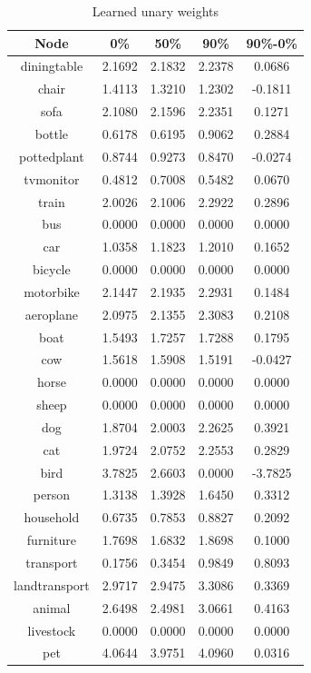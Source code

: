 \documentclass[11pt,a4paper]{article}
\begin{document}
\begin{table}[htbp]
\centering
\begin{tabular}{c|c|c|c|c}
Node & 0\% & 50\% & 90\% & 90\%-0\%\\\hline
diningtable   & 2.1692 & 2.1832 & 2.2378 & 0.0686\\
chair         & 1.4113 & 1.3210 & 1.2302 & -0.1811\\
sofa          & 2.1080 & 2.1596 & 2.2351 & 0.1271\\
bottle        & 0.6178 & 0.6195 & 0.9062 & 0.2884\\
pottedplant   & 0.8744 & 0.9273 & 0.8470 & -0.0274\\
tvmonitor     & 0.4812 & 0.7008 & 0.5482 & 0.0670\\
train         & 2.0026 & 2.1006 & 2.2922 & 0.2896\\
bus           & 0.0000 & 0.0000 & 0.0000 & 0.0000\\
car           & 1.0358 & 1.1823 & 1.2010 & 0.1652\\
bicycle       & 0.0000 & 0.0000 & 0.0000 & 0.0000\\
motorbike     & 2.1447 & 2.1935 & 2.2931 & 0.1484\\
aeroplane     & 2.0975 & 2.1355 & 2.3083 & 0.2108\\
boat          & 1.5493 & 1.7257 & 1.7288 & 0.1795\\
cow           & 1.5618 & 1.5908 & 1.5191 & -0.0427\\
horse         & 0.0000 & 0.0000 & 0.0000 & 0.0000\\
sheep         & 0.0000 & 0.0000 & 0.0000 & 0.0000\\
dog           & 1.8704 & 2.0003 & 2.2625 & 0.3921\\
cat           & 1.9724 & 2.0752 & 2.2553 & 0.2829\\
bird          & 3.7825 & 2.6603 & 0.0000 & -3.7825\\
person        & 1.3138 & 1.3928 & 1.6450 & 0.3312\\\hline
household     & 0.6735 & 0.7853 & 0.8827 & 0.2092\\
furniture     & 1.7698 & 1.6832 & 1.8698 & 0.1000\\
transport     & 0.1756 & 0.3454 & 0.9849 & 0.8093\\
landtransport & 2.9717 & 2.9475 & 3.3086 & 0.3369\\
animal        & 2.6498 & 2.4981 & 3.0661 & 0.4163\\
livestock     & 0.0000 & 0.0000 & 0.0000 & 0.0000\\
pet           & 4.0644 & 3.9751 & 4.0960 & 0.0316
\end{tabular}
\caption{Learned unary weights}
\label{tab:unary}
\end{table}
\end{document}
